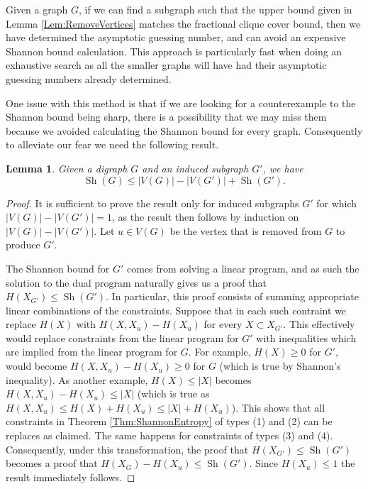 \documentclass[a4paper, 14pt]{extarticle}
\theoremstyle{plain}
\newtheorem{lemma}[proposition]{Lemma}
\DeclareMathOperator{\Sh}{Sh}
\begin{document}
Given a graph $G$, if we can find a subgraph such that the upper
bound given in Lemma \ref{Lem:RemoveVertices} matches the fractional
clique cover bound, then we have determined the asymptotic guessing
number, and can avoid an expensive Shannon bound calculation. This
approach is particularly fast when doing an exhaustive search as all
the smaller graphs will have had their asymptotic guessing numbers
already determined.

One issue with this method is that if we are looking for a
counterexample to the Shannon bound being sharp, there is a
possibility that we may miss them because we avoided calculating the
Shannon bound for every graph. Consequently to alleviate our fear we
need the following result.

\begin{lemma}\label{Lem:SubgraphShannonBound}
Given a digraph $G$ and an induced subgraph $G'$, we have
\[ \Sh(G) \leq |V(G)|-|V(G')| + \Sh(G'). \]
\end{lemma}

\begin{proof}
It is sufficient to prove the result only for induced subgraphs $G'$
for which $|V(G)|-|V(G')|=1$, as the result then follows by induction on $|V(G)|-|V(G')|$. Let $u\in V(G)$ be the vertex that is
removed from $G$ to produce $G'$.

The Shannon bound for $G'$ comes from solving a linear program, and
as such the solution to the dual program naturally gives us a proof
that $H(X_{G'}) \leq \Sh(G')$. In
particular, this proof consists of summing appropriate linear
combinations of the constraints. Suppose that in each such contraint we replace $H(X)$ with $H(X,X_u)-H(X_u)$ for every $X\subset X_{G'}$. This effectively
would replace constraints from the linear program for $G'$ with
inequalities which are implied from the linear program for $G$. For
example, $H(X)\geq 0$ for $G'$, would become $H(X,X_u)-H(X_u)\geq 0$
for $G$ (which is true by Shannon's inequality). As another example, $H(X)\leq |X|$
becomes $H(X,X_u)-H(X_u)\leq |X|$ (which is true as $H(X,X_u)\leq
H(X)+H(X_u)\leq |X|+H(X_u)$). This shows that all constraints in Theorem \ref{Thm:ShannonEntropy} of types (1) and (2) can be replaces as claimed. The same happens for constraints of types (3) and (4). Consequently, under this transformation, the proof that $H(X_{G'}) \leq \Sh(G')$ 
becomes a proof that $H(X_{G})-H(X_u) \leq \Sh(G')$. Since $H(X_u)\leq 1$ the result immediately
follows.
\end{proof}
\end{document}
